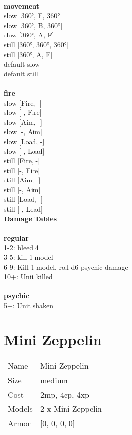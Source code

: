 \ \\ {\bf movement } \\
slow [360°, F, 360°] \\
slow [360°, B, 360°] \\
slow [360°, A, F] \\
still [360°, 360°, 360°] \\
still [360°, A, F] \\
default slow \\
default still \\
\ \\ {\bf fire } \\
slow [Fire, -] \\
slow [-, Fire] \\
slow [Aim, -] \\
slow [-, Aim] \\
slow [Load, -] \\
slow [-, Load] \\
still [Fire, -] \\
still [-, Fire] \\
still [Aim, -] \\
still [-, Aim] \\
still [Load, -] \\
still [-, Load] \\


{\bf Damage Tables} \\
\ \\ {\bf regular } \\
1-2: bleed 4 \\
3-5: kill 1 model \\
6-9: Kill 1 model, roll d6 psychic damage \\
10+: Unit killed \\
\ \\ {\bf psychic } \\
5+: Unit shaken \\










\pagebreak\pagebreak

\section{ Mini Zeppelin }

\begin{tabular}{ll}
  Name & Mini Zeppelin \\
  Size & medium\\
  Cost & 2mp, 4cp, 4xp\\
  Models & 2 x Mini Zeppelin\\
  Armor & [0, 0, 0, 0]\\
\end{tabular}

